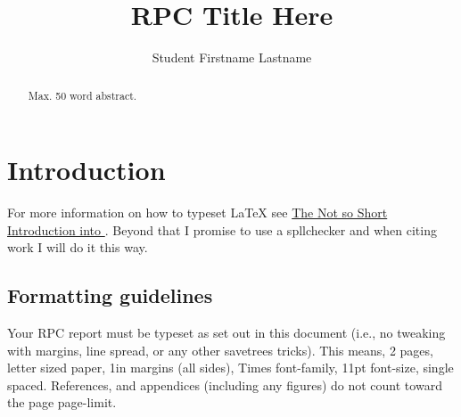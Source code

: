 \documentclass[letterpaper,11pt]{article}
\title{RPC Title Here}
\author{Student Firstname Lastname}
\date{}
\begin{document}
\maketitle

\begin{abstract}
  Max. 50 word abstract.
\end{abstract}

\section{Introduction}

For more information on how to typeset \LaTeX{} see 
\href{http://mirrors.ctan.org/info/lshort/english/lshort.pdf}
{The Not so Short Introduction into \LaTeXe}.
Beyond that I promise to use a spllchecker and when citing work I will do it this way\cite{cao15:edgeminer}.

\subsection{Formatting guidelines}
Your RPC report must be typeset as set out in this document (i.e., no tweaking
with margins, line spread, or any other savetrees tricks). This
means, 2 pages, letter sized paper, 1in margins (all sides), Times font-family, 11pt
font-size, single spaced. References, and appendices (including any figures) do
not count toward the page page-limit.



\end{document}
